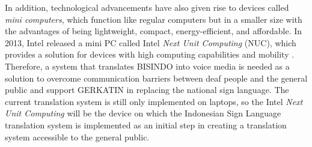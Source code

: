 In addition, technological advancements have also given rise to devices called \emph{mini computers}, which function like regular computers but in a smaller size with the advantages of being lightweight, compact, energy-efficient, and affordable. In 2013, Intel released a mini PC called Intel \emph{Next Unit Computing} (NUC), which provides a solution for devices with high computing capabilities and mobility \cite{minny2023}. Therefore, a system that translates BISINDO into voice media is needed as a solution to overcome communication barriers between deaf people and the general public and support GERKATIN in replacing the national sign language. The current translation system is still only implemented on laptops, so the Intel \emph{Next Unit Computing} will be the device on which the Indonesian Sign Language translation system is implemented as an initial step in creating a translation system accessible to the general public.
